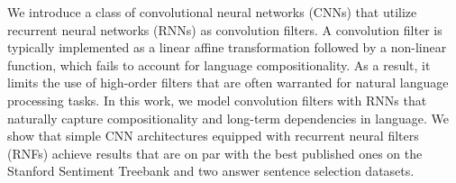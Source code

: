 We introduce a class of convolutional neural networks (CNNs) that utilize recurrent neural networks (RNNs) as convolution filters. A convolution filter is typically implemented as a linear affine transformation followed by a non-linear function, which fails to account for language compositionality. As a result, it limits the use of high-order filters that are often warranted for natural language processing tasks. In this work, we model convolution filters with RNNs that naturally capture compositionality and long-term dependencies in language. We show that simple CNN architectures equipped with recurrent neural filters (RNFs) achieve results that are on par with the best published ones on the Stanford Sentiment Treebank and two answer sentence selection datasets.
